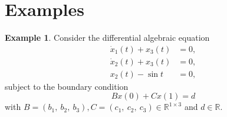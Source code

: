 \documentclass[preprint,12pt]{elsarticle}
\numberwithin{equation}{section}
\theoremstyle{definition}
\newtheorem{example}[theorem]{Example}
\begin{document}
\section{Examples}


\begin{example}
     Consider the differential algebraic equation
  \begin{equation}\label{Ex_reg_syst}
  \begin{aligned}
     \dot{x}_1(t)+x_3(t)&=0,\\
     \dot{x}_2(t)+x_3(t)&=0,\\
     x_2(t)-\sin t&=0,
     \end{aligned}
\end{equation}
subject to the boundary condition
\begin{equation}\label{Ex_reg_BC}
    Bx(0)+Cx(1)=d
\end{equation}
with $B=(b_1,~b_2,~b_3), C=(c_1,~c_2,~c_3)\in\mathbb{R}^{1\times 3}$ and $d\in\mathbb{R}$.
\vskip0.3cm


\end{example}
\end{document}
